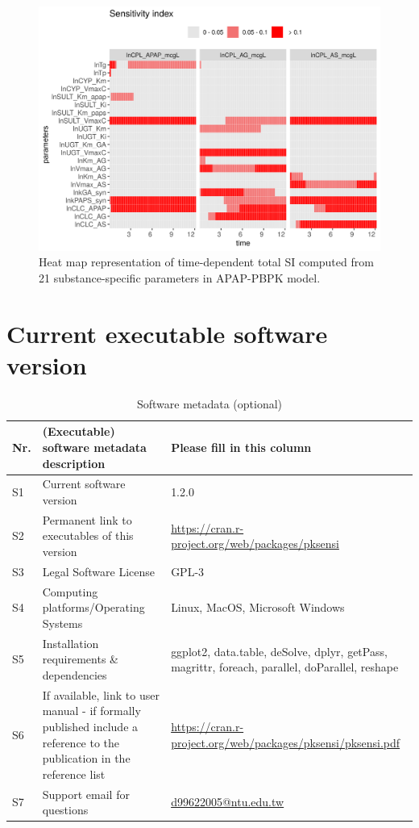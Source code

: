\documentclass[preprint,12pt, a4paper]{elsarticle}
\begin{document}
\begin{landscape}
\clearpage
\newpage

\begin{figure}
\includegraphics[width=1\linewidth]{example-2} 
\caption{Heat map representation of time-dependent total SI computed from 21 substance-specific parameters in APAP-PBPK model.}
\label{fig:example-2}
\end{figure}

\end{landscape}


\section*{Current executable software version}
\label{}

\begin{table}[!h]
\begin{tabular}{|l|p{6.5cm}|p{6.5cm}|}
\hline
\textbf{Nr.} & \textbf{(Executable) software metadata description} & \textbf{Please fill in this column} \\
\hline
S1 & Current software version & 1.2.0 \\
\hline
S2 & Permanent link to executables of this version  & \url{https://cran.r-project.org/web/packages/pksensi} \\
\hline
S3 & Legal Software License & GPL-3 \\
\hline
S4 & Computing platforms/Operating Systems & Linux, MacOS, Microsoft Windows \\
\hline
S5 & Installation requirements \& dependencies & ggplot2, data.table, deSolve, dplyr, getPass, magrittr, foreach, parallel, doParallel, reshape \\
\hline
S6 & If available, link to user manual - if formally published include a reference to the publication in the reference list & \url{https://cran.r-project.org/web/packages/pksensi/pksensi.pdf} \\
\hline
S7 & Support email for questions & \url{d99622005@ntu.edu.tw}\\
\hline
\end{tabular}
\caption{Software metadata (optional)}
\label{} 
\end{table}
\end{document}
